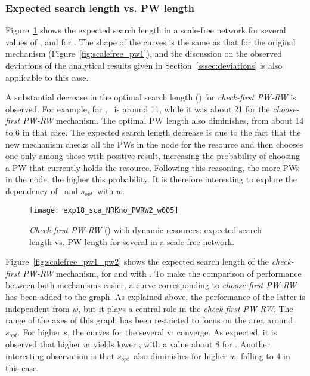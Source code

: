 \documentclass[]{elsarticle}
\newcommand{\s}		{\ensuremath{s}}		\newcommand{\sopt}	{\ensuremath{s_{opt}}}		\newcommand{\p}		{\ensuremath{p}}		\newcommand{\W}		{\ensuremath{W}}		\newcommand{\w}		{\ensuremath{w}}		\newcommand{\lsave}	{\ensuremath{\overline{l}_s}}	\newcommand{\lave}	{\ensuremath{\overline{l}}}	\newcommand{\lopt}	{\ensuremath{\overline{l}_{opt}}}
\begin{document}
\subsubsection{Expected search length vs. PW length}

Figure~\ref{fig:scalefree_pw2} shows the expected search length in a scale-free network for several values of \pd, and for . 
The shape of the curves is the same as that for the original mechanism (Figure~\ref{fig:scalefree_pw1}), 
and the discussion on the observed deviations of the analytical results given in Section~\ref{sssec:deviations} is also applicable to this case.

A substantial decrease in the optimal search length (\Lexpopt) for \emph{check-first PW-RW} is observed. For example, for , \Lexpopt\ is around 11, while it was about 21 for the \emph{choose-first PW-RW} mechanism. The optimal PW length also diminishes, from about 14 to 6 in that case.
The expected search length decrease is due to the fact that the new mechanism checks all the PWs in the node for the resource and then chooses one only among those with positive result, increasing the probability of choosing a PW that currently holds the resource. Following this reasoning, the more PWs in the node, the higher this probability. It is therefore interesting to explore the dependency of \Lexp\ and \sopt\ with \w. 


\begin{figure}
 \centering
 \texttt{[image: exp18\_sca\_NRKno\_PWRW2\_w005]}
 \caption{\emph{Check-first PW-RW} () with dynamic resources: expected search length  vs. PW length  for several  in a scale-free network.}
 \label{fig:scalefree_pw2}
\end{figure}

Figure~\ref{fig:scalefree_pw1_pw2} shows the expected search length of the \emph{check-first PW-RW} mechanism, for  and  with . To make the comparison of performance between both mechanisms easier, a curve corresponding to \emph{choose-first PW-RW} has been added to the graph. As explained above, the performance of the latter is independent from \w, but it plays a central role in the \emph{check-first PW-RW}. The range of the axes of this graph has been restricted to focus on the area around \sopt. For higher \s, the curves for the several \w\ converge.
As expected, it is observed that higher \w\ yields lower \Lexpopt, with a value about 8 for . Another interesting observation is that \sopt\ also diminishes for higher \w, falling to 4 in this case. 
\end{document}
